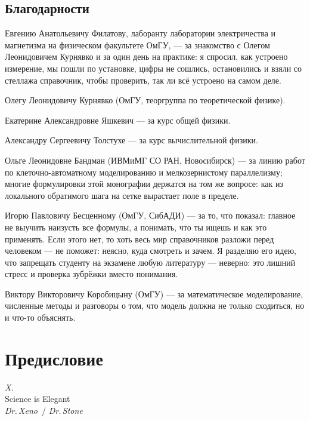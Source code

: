 \section*{Благодарности}

\noindent
Евгению Анатольевичу Филатову, лаборанту лаборатории электричества и магнетизма
на физическом факультете ОмГУ, --- за знакомство с Олегом Леонидовичем Курнявко
и за один день на практике: я спросил, как устроено измерение, мы пошли по установке,
цифры не сошлись, остановились и взяли со стеллажа справочник, чтобы проверить,
так ли всё устроено на самом деле.

\medskip
\noindent
Олегу Леонидовичу Курнявко (ОмГУ, теоргруппа по теоретической физике).

\medskip
\noindent
Екатерине Александровне Яшкевич --- за курс общей физики.

\medskip
\noindent
Александру Сергеевичу Толстухе --- за курс вычислительной физики.

\medskip
\noindent
Ольге Леонидовне Бандман (ИВМиМГ СО РАН, Новосибирск) --- за линию работ
по клеточно-автоматному моделированию и мелкозернистому параллелизму;
многие формулировки этой монографии держатся на том же вопросе:
как из локального обратимого шага на сетке вырастает поле в пределе.

\medskip
\noindent
Игорю Павловичу Бесценному (ОмГУ, СибАДИ) --- за то, что показал: главное не выучить
наизусть все формулы, а понимать, что ты ищешь и как это применять.
Если этого нет, то хоть весь мир справочников разложи перед человеком --- не поможет:
неясно, куда смотреть и зачем.
Я разделяю его идею, что запрещать студенту на экзамене любую литературу --- неверно:
это лишний стресс и проверка зубрёжки вместо понимания.

\medskip
\noindent
Виктору Викторовичу Коробицыну (ОмГУ) --- за математическое моделирование,
численные методы и разговоры о том, что модель должна не только сходиться, но и что-то объяснять.

\chapter*{Предисловие}

\begin{flushright}
\begin{minipage}{0.55\textwidth}
\raggedleft
\textit{X.}\\[0.8em]
{\large Science is Elegant}\\[0.6em]
\emph{Dr.\,Xeno}\ / \emph{Dr.\,Stone}
\end{minipage}
\end{flushright}
\vspace{1.5em}

